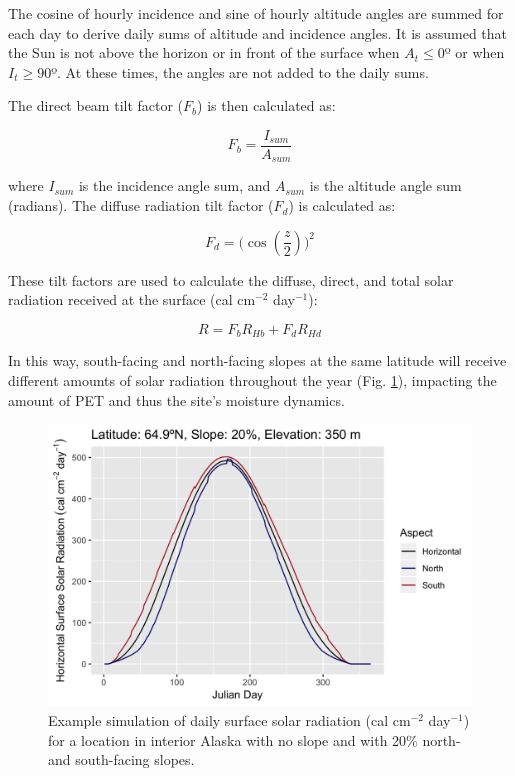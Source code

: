\documentclass[a4paper, 12pt] {report}
\begin{document}
The cosine of hourly incidence and sine of hourly altitude angles are summed for each day to derive daily sums of altitude and incidence angles. It is assumed that the Sun is not above the horizon or in front of the surface when $A_t \le 0$º or when $I_t \ge 90$º. At these times, the angles are not added to the daily sums.

The direct beam tilt factor ($F_b$) is then calculated as:

\begin{equation}
F_b = \frac{I_{sum}}{A_{sum}}
\end{equation}

where $I_{sum}$ is the incidence angle sum, and $A_{sum}$ is the altitude angle sum (radians). The diffuse radiation tilt factor ($F_d$) is calculated as:

\begin{equation}
F_d = \Big(\cos(\frac{z}{2})\Big)^2
\end{equation}

These tilt factors are used to calculate the diffuse, direct, and total solar radiation received at the surface (cal cm$^{-2}$ day$^{-1}$):

\begin{equation}
R = F_bR_{Hb} + F_dR_{Hd}
\end{equation}

In this way, south-facing and north-facing slopes at the same latitude will receive different amounts of solar radiation throughout the year (Fig. \ref{fig:finalrad}), impacting the amount of PET and thus the site's moisture dynamics.

\begin{figure}
  \includegraphics[width=0.8\linewidth]{Figures/Final_Radiation.png}
  \caption{Example simulation of daily surface solar radiation (cal cm$^{-2}$ day$^{-1}$) for a location in interior Alaska with no slope and with 20\% north- and south-facing slopes.}
  \label{fig:finalrad}
\end{figure}
\end{document}
